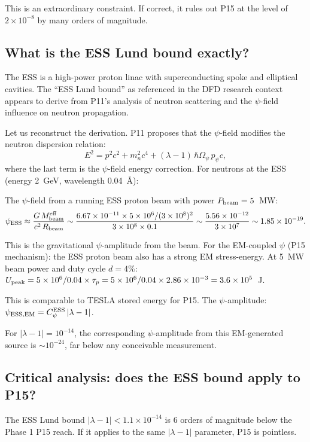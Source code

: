 \documentclass[11pt]{article}
\newcommand{\ee}[1]{\times 10^{#1}}
\newcommand{\Opsi}{\Omega_\psi}
\newcommand{\lam}{\lambda}
\begin{document}
This is an extraordinary constraint. If correct, it rules out P15 at the level
of $2\ee{-8}$ by many orders of magnitude.

\subsection{What is the ESS Lund bound exactly?}

The ESS is a high-power proton linac with superconducting spoke and elliptical
cavities. The ``ESS Lund bound'' as referenced in the DFD research context
appears to derive from P11's analysis of neutron scattering and the $\psi$-field
influence on neutron propagation.

Let us reconstruct the derivation. P11 proposes that the $\psi$-field modifies
the neutron dispersion relation:
\begin{equation}
E^2 = p^2 c^2 + m_n^2 c^4 + (\lam-1)\,\hbar\Opsi\,p_\psi c,
\end{equation}
where the last term is the $\psi$-field energy correction. For neutrons at
the ESS (energy 2~GeV, wavelength 0.04~\AA):

The $\psi$-field from a running ESS proton beam with power $P_{\rm beam} = 5$~MW:
\begin{equation}
\psi_{\rm ESS} \approx \frac{G\,M_{\rm beam}^{\rm eff}}{c^2\,R_{\rm beam}}
\sim \frac{6.67\ee{-11} \times 5\ee{6}/(3\ee{8})^2}{3\ee{8} \times 0.1}
\sim \frac{5.56\ee{-12}}{3\ee{7}} \sim 1.85\ee{-19}.
\end{equation}

This is the gravitational $\psi$-amplitude from the beam. For the EM-coupled
$\psi$ (P15 mechanism): the ESS proton beam also has a strong EM stress-energy.
At 5~MW beam power and duty cycle $d = 4\%$: $U_{\rm peak} = 5\ee{6}/0.04
\times \tau_p = 5\ee{6}/0.04 \times 2.86\ee{-3} = 3.6\ee{5}$~J.

This is comparable to TESLA stored energy for P15. The $\psi$-amplitude:
$\psi_{\rm ESS,EM} = C_\psi^{\rm ESS}\,|\lam-1|$.

For $|\lam-1| = 10^{-14}$, the corresponding $\psi$-amplitude from this
EM-generated source is $\sim 10^{-24}$, far below any conceivable measurement.

\subsection{Critical analysis: does the ESS bound apply to P15?}

The ESS Lund bound $|\lam-1| < 1.1\ee{-14}$ is $6$ orders of magnitude
below the Phase 1 P15 reach. If it applies to the same $|\lam-1|$ parameter,
P15 is pointless.
\end{document}
